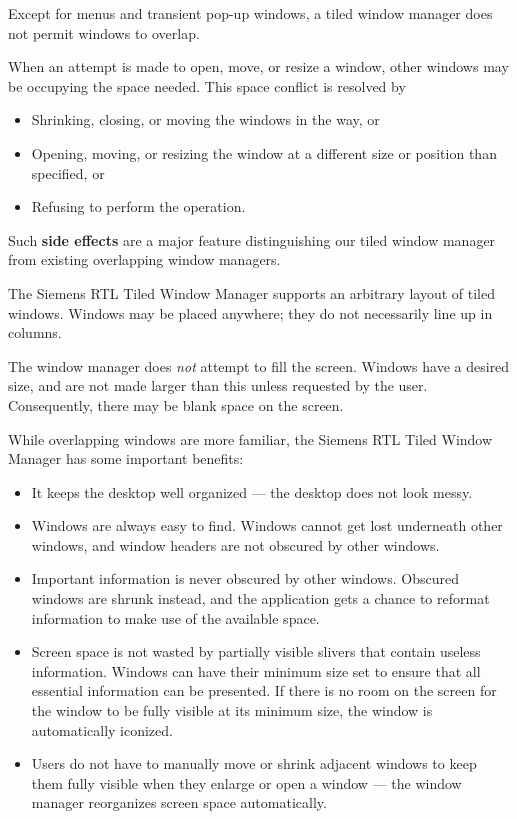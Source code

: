 Except for menus and transient pop-up windows,
a tiled window manager does not permit windows to overlap.

When an attempt is made to open, move, or resize a window, other windows
may be occupying the space needed.  This space conflict is resolved by
\begin{itemize}
\item Shrinking, closing, or moving the windows in the way, or

\item Opening, moving, or resizing the window at a different size or position
than specified, or

\item Refusing to perform the operation.
\end{itemize}

Such {\bf side effects} are a major feature distinguishing our tiled window
manager from existing overlapping window managers.

The Siemens RTL Tiled Window Manager supports an arbitrary layout of
tiled windows.
Windows may be placed anywhere; they do not necessarily line up in
columns.

The window manager does {\it not} attempt to fill the screen.
Windows have a desired size, and are not made larger than this unless
requested by the user.
Consequently, there may be blank space on the screen.

While overlapping windows are more familiar, the Siemens RTL Tiled Window
Manager has some important benefits:

\begin{itemize}
\item It keeps the desktop well organized --- the desktop does not look messy.

\item Windows are always easy to find.  Windows cannot get lost underneath
other windows, and window headers are not obscured by other windows.

\item Important information is never obscured by other windows.  Obscured
windows are shrunk instead, and the application gets a chance to
reformat information to make use of the available space.

\item Screen space is not wasted by partially visible slivers that contain
useless information.  Windows can have their minimum size set to ensure
that all essential information can be presented.  If there
is no room on the screen for the window to be fully visible at its
minimum size, the window is automatically iconized.

\item Users do not have to manually move or shrink adjacent windows to keep
them fully visible when they enlarge or open a window --- the window
manager reorganizes screen space automatically.
\end{itemize}

